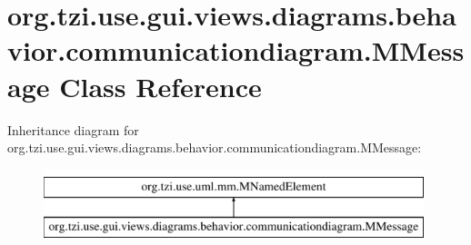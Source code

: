 \hypertarget{classorg_1_1tzi_1_1use_1_1gui_1_1views_1_1diagrams_1_1behavior_1_1communicationdiagram_1_1_m_message}{\section{org.\-tzi.\-use.\-gui.\-views.\-diagrams.\-behavior.\-communicationdiagram.\-M\-Message Class Reference}
\label{classorg_1_1tzi_1_1use_1_1gui_1_1views_1_1diagrams_1_1behavior_1_1communicationdiagram_1_1_m_message}
}
Inheritance diagram for org.\-tzi.\-use.\-gui.\-views.\-diagrams.\-behavior.\-communicationdiagram.\-M\-Message\-:\begin{figure}[H]
\begin{center}
\leavevmode
\includegraphics[height=2.000000cm]{classorg_1_1tzi_1_1use_1_1gui_1_1views_1_1diagrams_1_1behavior_1_1communicationdiagram_1_1_m_message}
\end{center}
\end{figure}
